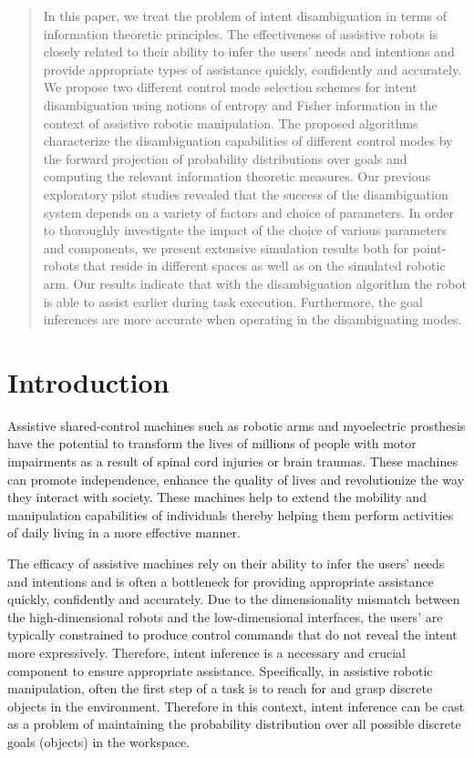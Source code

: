 \documentclass[conference]{IEEEtran}
\begin{document}
\begin{abstract}
In this paper, we treat the problem of intent disambiguation in terms of information theoretic principles. The effectiveness of assistive robots is closely related to their ability to infer the users' needs and intentions and provide appropriate types of assistance quickly, confidently and accurately.  We propose two different control mode selection schemes for intent disambiguation using notions of entropy and Fisher information in the context of assistive robotic manipulation. The proposed algorithms characterize the disambiguation capabilities of different control modes by the forward projection of probability distributions over goals and computing the relevant information theoretic measures. Our previous exploratory pilot studies revealed that the success of the disambiguation system depends on a variety of factors and choice of parameters. In order to thoroughly investigate the impact of the choice of various parameters and components, we present extensive simulation results both for point-robots that reside in different spaces as well as on the simulated robotic arm. Our results indicate that with the disambiguation algorithm the robot is able to assist earlier during task execution. Furthermore, the goal inferences are more accurate when operating in the disambiguating modes. 
\end{abstract}

\IEEEpeerreviewmaketitle

\section{Introduction}
Assistive shared-control machines such as robotic arms and myoelectric prosthesis have the potential to transform the lives of millions of people with motor impairments as a result of spinal cord injuries or brain traumas. These machines can promote independence, enhance the quality of lives and revolutionize the way they interact with society. These machines help to extend the mobility and manipulation capabilities of individuals thereby helping them perform activities of daily living in a more effective manner. 

The efficacy of assistive machines rely on their ability to infer the users' needs and intentions and is often a bottleneck for providing appropriate assistance quickly, confidently and accurately. Due to the dimensionality mismatch between the high-dimensional robots and the low-dimensional interfaces, the users' are typically constrained to produce control commands that do not reveal the intent more expressively. Therefore, intent inference is a necessary and crucial component to ensure appropriate assistance. Specifically, in assistive robotic manipulation, often the first step of a task is to reach for and grasp discrete objects in the environment. Therefore in this context, intent inference can be cast as a problem of maintaining the probability distribution over all possible discrete goals (objects) in the workspace. 
\end{document}
